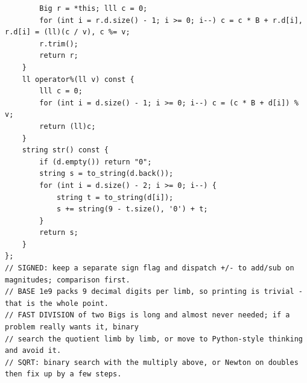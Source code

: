 \documentclass[9pt,a4paper,twocolumn]{extarticle}
\begin{document}
\begin{lstlisting}
        Big r = *this; lll c = 0;
        for (int i = r.d.size() - 1; i >= 0; i--) c = c * B + r.d[i], r.d[i] = (ll)(c / v), c %= v;
        r.trim();
        return r;
    }
    ll operator%(ll v) const {
        lll c = 0;
        for (int i = d.size() - 1; i >= 0; i--) c = (c * B + d[i]) % v;
        return (ll)c;
    }
    string str() const {
        if (d.empty()) return "0";
        string s = to_string(d.back());
        for (int i = d.size() - 2; i >= 0; i--) {
            string t = to_string(d[i]);
            s += string(9 - t.size(), '0') + t;
        }
        return s;
    }
};
// SIGNED: keep a separate sign flag and dispatch +/- to add/sub on magnitudes; comparison first.
// BASE 1e9 packs 9 decimal digits per limb, so printing is trivial - that is the whole point.
// FAST DIVISION of two Bigs is long and almost never needed; if a problem really wants it, binary
// search the quotient limb by limb, or move to Python-style thinking and avoid it.
// SQRT: binary search with the multiply above, or Newton on doubles then fix up by a few steps.
\end{lstlisting}

\filbreak
\end{document}
